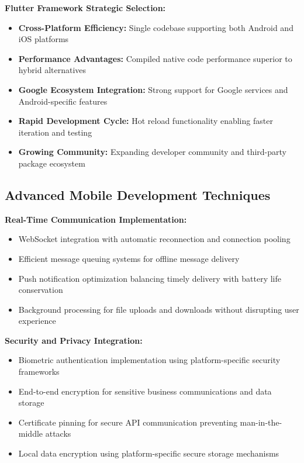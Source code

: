 \textbf{Flutter Framework Strategic Selection:}
\begin{itemize}
    \item \textbf{Cross-Platform Efficiency:} Single codebase supporting both Android and iOS platforms
    \item \textbf{Performance Advantages:} Compiled native code performance superior to hybrid alternatives
    \item \textbf{Google Ecosystem Integration:} Strong support for Google services and Android-specific features
    \item \textbf{Rapid Development Cycle:} Hot reload functionality enabling faster iteration and testing
    \item \textbf{Growing Community:} Expanding developer community and third-party package ecosystem
\end{itemize}

\subsection{Advanced Mobile Development Techniques}

\textbf{Real-Time Communication Implementation:}
\begin{itemize}
    \item WebSocket integration with automatic reconnection and connection pooling
    \item Efficient message queuing systems for offline message delivery
    \item Push notification optimization balancing timely delivery with battery life conservation
    \item Background processing for file uploads and downloads without disrupting user experience
\end{itemize}

\textbf{Security and Privacy Integration:}
\begin{itemize}
    \item Biometric authentication implementation using platform-specific security frameworks
    \item End-to-end encryption for sensitive business communications and data storage
    \item Certificate pinning for secure API communication preventing man-in-the-middle attacks
    \item Local data encryption using platform-specific secure storage mechanisms
\end{itemize}

